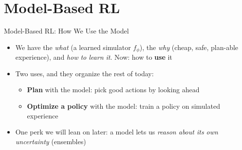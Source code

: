 \section{Model-Based RL}
\begin{frame}{Model-Based RL: How We Use the Model}
\begin{itemize}
    \item We have the \emph{what} (a learned simulator $f_\phi$), the \emph{why}
          (cheap, safe, plan-able experience), and \emph{how to learn it}. Now:
          how to \textbf{use} it
    \item Two uses, and they organize the rest of today:
    \begin{itemize}
        \item \textbf{Plan} with the model: pick good actions by looking ahead
        \item \textbf{Optimize a policy} with the model: train a policy on
              simulated experience
    \end{itemize}
    \item One perk we will lean on later: a model lets us \emph{reason about its
          own uncertainty} (ensembles)
\end{itemize}
\end{frame}
